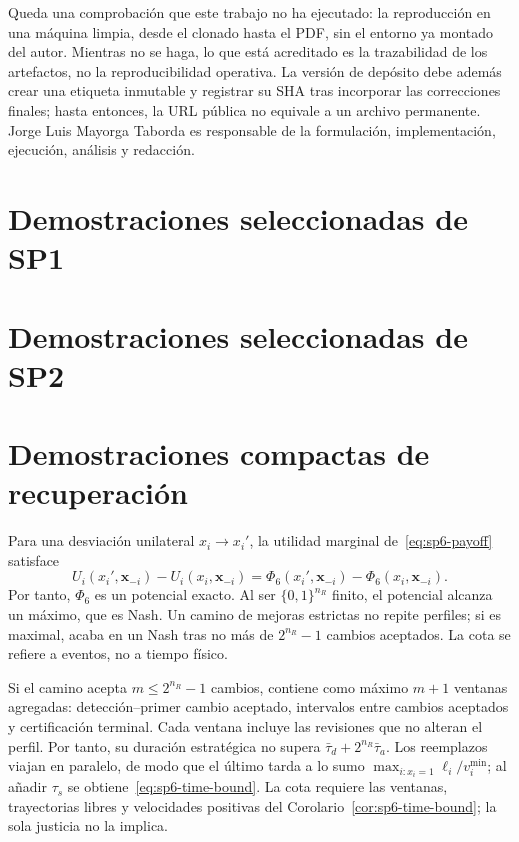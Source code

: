 Queda una comprobación que este trabajo no ha ejecutado: la reproducción en
una máquina limpia, desde el clonado hasta el PDF, sin el entorno ya montado
del autor. Mientras no se haga, lo que está acreditado es la trazabilidad de
los artefactos, no la reproducibilidad operativa. La versión de depósito debe
además crear una etiqueta inmutable y registrar su SHA tras incorporar las
correcciones finales; hasta entonces, la URL pública no equivale a un archivo
permanente. Jorge Luis Mayorga Taborda es responsable de la formulación,
implementación, ejecución, análisis y redacción.

\section{Demostraciones seleccionadas de SP1}
\label{app:sp1-all-proofs}



\section{Demostraciones seleccionadas de SP2}
\label{app:sp2-all-proofs}



\section{Demostraciones compactas de recuperación}
\label{app:sp6-proofs}

Para una desviación unilateral $x_i\to x_i'$, la utilidad marginal de~\eqref{eq:sp6-payoff} satisface
\[
 U_i(x_i',\boldsymbol x_{-i})-U_i(x_i,\boldsymbol x_{-i})
 =\Phi_6(x_i',\boldsymbol x_{-i})-\Phi_6(x_i,\boldsymbol x_{-i}).
\]
Por tanto, $\Phi_6$ es un potencial exacto. Al ser $\{0,1\}^{n_R}$ finito, el potencial alcanza un máximo, que es Nash. Un camino de mejoras estrictas no repite perfiles; si es maximal, acaba en un Nash tras no más de $2^{n_R}-1$ cambios aceptados. La cota se refiere a eventos, no a tiempo físico.

Si el camino acepta $m\leq2^{n_R}-1$ cambios, contiene como máximo $m+1$
ventanas agregadas: detección--primer cambio aceptado, intervalos entre cambios
aceptados y certificación terminal. Cada ventana incluye las revisiones que no
alteran el perfil. Por tanto, su duración estratégica no supera
$\bar\tau_d+2^{n_R}\bar\tau_a$. Los reemplazos viajan en paralelo, de modo que
el último tarda a lo sumo $\max_{i:x_i=1}\ell_i/v_i^{\min}$; al añadir
$\tau_s$ se obtiene~\eqref{eq:sp6-time-bound}. La cota requiere las ventanas,
trayectorias libres y velocidades positivas del Corolario~\ref{cor:sp6-time-bound};
la sola justicia no la implica.

